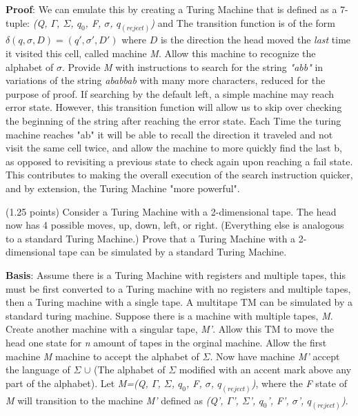 \documentclass{article}
\begin{document}
\begin{compactenum}
\medskip
\textbf{Proof}: We can emulate this by creating a Turing Machine that is defined as a 7-tuple: \emph{(Q, $\Gamma$, $\Sigma$, ${q_0 }$, F, $\sigma$, ${q_(reject)}$)} and  The transition function is of the form $\delta(q,\sigma,D) = (q',\sigma',D')$ where $D$ is the direction the head moved the \emph{last} time it visited this cell, called machine \emph{M}. Allow this machine to recognize the alphabet of $\sigma$. Provide \emph{M} with  instructions to search for the string \emph{"abb"} in variations of the string \emph{ababbab} with many more characters, reduced for the purpose of proof. If searching by the default left, a simple machine may reach error state. However, this transition function will allow us to skip over checking the beginning of the string after reaching the error state. Each Time the turing machine reaches "ab" it will be able to recall the direction it traveled and not visit the same cell twice, and allow the machine to more quickly find the last b, as opposed to revisiting a previous state to check again upon reaching a fail state. This contributes to making the overall execution of the search instruction quicker, and by extension, the Turing Machine "more powerful".
\medskip
\item (1.25 points) Consider a Turing Machine with a 2-dimensional tape. The head now has 4 possible moves,
up, down, left, or right. (Everything else is analogous to a standard Turing Machine.)
Prove that a Turing Machine with a 2-dimensional tape can be simulated by a standard Turing Machine.

\medskip
\textbf{Basis}: Assume there is a Turing Machine with registers and multiple tapes, this must be first converted to a Turing machine with no registers and multiple tapes, then a  Turing machine with a single tape.
A multitape TM can be simulated by a standard turing machine. Suppose there is a machine with multiple tapes, \emph{M}. Create another machine with a singular tape, \emph{M'}. Allow this TM to move the head one state for \emph{n} 
amount of tapes in the orginal machine. Allow the first machine \emph{M} machine to accept the alphabet of $\Sigma$.  Now have machine \emph{M'} accept the language of $\Sigma$ $\cup$ (The alphabet of $\Sigma$ modified with an accent mark above any part of the alphabet).
Let \emph {M=\emph{(Q, $\Gamma$, $\Sigma$, ${q_0 }$, F, $\sigma$, ${q_(reject)}$)}}, where the \emph{F} state of \emph{M} will transition to the machine \emph{M'} defined as \emph{(Q', $\Gamma$', $\Sigma$', ${q_0 }$', F', $\sigma$', ${q_(reject)}$)}.
 

\end{compactenum}
\end{document}
